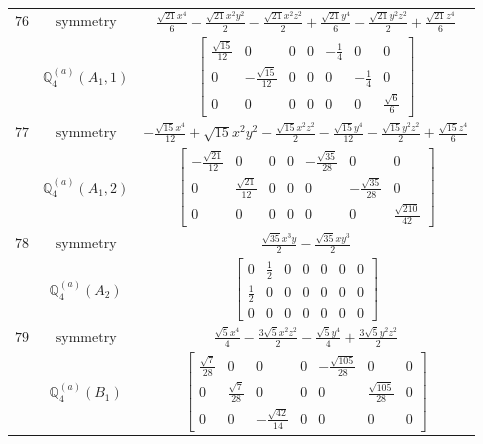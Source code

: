 \documentclass[fleqn,8pt,landscape]{jsarticle}
\begin{document}
\begin{longtable}{ccc}
$ 76 $ & $ \text{symmetry} $ & $ \frac{\sqrt{21} x^{4}}{6} - \frac{\sqrt{21} x^{2} y^{2}}{2} - \frac{\sqrt{21} x^{2} z^{2}}{2} + \frac{\sqrt{21} y^{4}}{6} - \frac{\sqrt{21} y^{2} z^{2}}{2} + \frac{\sqrt{21} z^{4}}{6} $ \\
$  $ & $ \mathbb{Q}_{4}^{(a)}(A_{1},1) $ & $ \begin{bmatrix} \frac{\sqrt{15}}{12} & 0 & 0 & 0 & - \frac{1}{4} & 0 & 0 \\ 0 & - \frac{\sqrt{15}}{12} & 0 & 0 & 0 & - \frac{1}{4} & 0 \\ 0 & 0 & 0 & 0 & 0 & 0 & \frac{\sqrt{6}}{6} \end{bmatrix} $ \\ \hline
$ 77 $ & $ \text{symmetry} $ & $ - \frac{\sqrt{15} x^{4}}{12} + \sqrt{15} x^{2} y^{2} - \frac{\sqrt{15} x^{2} z^{2}}{2} - \frac{\sqrt{15} y^{4}}{12} - \frac{\sqrt{15} y^{2} z^{2}}{2} + \frac{\sqrt{15} z^{4}}{6} $ \\
$  $ & $ \mathbb{Q}_{4}^{(a)}(A_{1},2) $ & $ \begin{bmatrix} - \frac{\sqrt{21}}{12} & 0 & 0 & 0 & - \frac{\sqrt{35}}{28} & 0 & 0 \\ 0 & \frac{\sqrt{21}}{12} & 0 & 0 & 0 & - \frac{\sqrt{35}}{28} & 0 \\ 0 & 0 & 0 & 0 & 0 & 0 & \frac{\sqrt{210}}{42} \end{bmatrix} $ \\ \hline
$ 78 $ & $ \text{symmetry} $ & $ \frac{\sqrt{35} x^{3} y}{2} - \frac{\sqrt{35} x y^{3}}{2} $ \\
$  $ & $ \mathbb{Q}_{4}^{(a)}(A_{2}) $ & $ \begin{bmatrix} 0 & \frac{1}{2} & 0 & 0 & 0 & 0 & 0 \\ \frac{1}{2} & 0 & 0 & 0 & 0 & 0 & 0 \\ 0 & 0 & 0 & 0 & 0 & 0 & 0 \end{bmatrix} $ \\ \hline
$ 79 $ & $ \text{symmetry} $ & $ \frac{\sqrt{5} x^{4}}{4} - \frac{3 \sqrt{5} x^{2} z^{2}}{2} - \frac{\sqrt{5} y^{4}}{4} + \frac{3 \sqrt{5} y^{2} z^{2}}{2} $ \\
$  $ & $ \mathbb{Q}_{4}^{(a)}(B_{1}) $ & $ \begin{bmatrix} \frac{\sqrt{7}}{28} & 0 & 0 & 0 & - \frac{\sqrt{105}}{28} & 0 & 0 \\ 0 & \frac{\sqrt{7}}{28} & 0 & 0 & 0 & \frac{\sqrt{105}}{28} & 0 \\ 0 & 0 & - \frac{\sqrt{42}}{14} & 0 & 0 & 0 & 0 \end{bmatrix} $ \\ \hline

\end{longtable}
\end{document}
